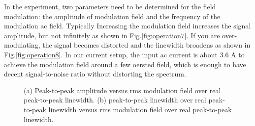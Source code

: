 In the experiment, two parameters need to be determined for the field modulation: the amplitude of modulation field and the frequency of the modulation ac field. Typically Increasing the modulation field increases the signal amplitude, but not infinitely as shown in Fig.\ref{fig:operation7}. If you are over-modulating, the signal becomes distorted and the linewidth broadens as shown in Fig.\ref{fig:operation8}. In our current setup, the input ac current is about 3.6 A to achieve the modulation field around a few oersted field, which is enough to have decent signal-to-noise ratio without distorting the spectrum.


\begin{figure}[h]
\centering
{}
\caption{(a) Peak-to-peak amplitude versus rms modulation field over real peak-to-peak linewidth. (b) peak-to-peak linewidth over real peak-to-peak linewidth versus rms modulation field over real peak-to-peak linewidth.}
\end{figure}


\clearpage








